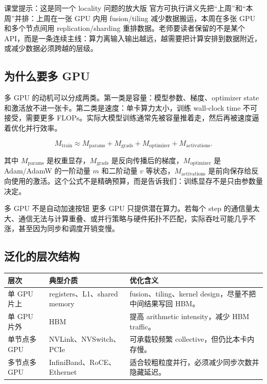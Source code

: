 \documentclass[a4paper]{article}
\begin{document}
\begin{knowledgebox}{课堂提示：这是同一个 locality 问题的放大版}
官方可执行讲义先把“上周”和“本周”并排：上周在一张 GPU 内用 fusion/tiling 减少数据搬运，本周在多张 GPU 和多个节点间用 replication/sharding 重排数据。老师要读者保留的不是某个 API，而是一条连续主线：算力离输入输出越远，越需要把计算安排到数据附近，或减少数据必须跨越的层级。
\end{knowledgebox}

\subsection{为什么要多 GPU}

多 GPU 的动机可以分成两类。第一类是容量：模型参数、梯度、optimizer state 和激活放不进一张卡。第二类是速度：单卡算力太小，训练 wall-clock time 不可接受，需要更多 FLOPs。实际大模型训练通常先被容量推着走，然后再被速度逼着优化并行效率。

\[
M_{\text{train}}
    \approx M_{\text{params}}
    + M_{\text{grads}}
    + M_{\text{optimizer}}
    + M_{\text{activations}} .
\]

其中 \(M_{\text{params}}\) 是权重显存，\(M_{\text{grads}}\) 是反向传播后的梯度，\(M_{\text{optimizer}}\) 是 Adam/AdamW 的一阶动量 \(m\) 和二阶动量 \(v\) 等状态，\(M_{\text{activations}}\) 是前向保存给反向使用的激活。这个公式不是精确预算，而是告诉我们：训练显存不是只由参数量决定。

\begin{warningbox}{多 GPU 不是自动加速按钮}
更多 GPU 只提供潜在算力。若每个 step 的通信量太大、通信无法与计算重叠、或并行策略与硬件拓扑不匹配，实际吞吐可能几乎不涨，甚至因为同步和调度开销变慢。
\end{warningbox}

\subsection{泛化的层次结构}

\begin{center}
\begin{tabular}{L{0.25\textwidth}L{0.3\textwidth}L{0.35\textwidth}}
\toprule
层次 & 典型介质 & 优化含义 \\
\midrule
单 GPU 片上 & registers、L1、shared memory & fusion、tiling、kernel design，尽量不把中间结果写回 HBM。 \\
单 GPU 片外 & HBM & 提高 arithmetic intensity，减少 HBM traffic。 \\
单节点多 GPU & NVLink、NVSwitch、PCIe & 可承载较频繁 collective，但仍比本卡内存慢。 \\
多节点多 GPU & InfiniBand、RoCE、Ethernet & 适合较粗粒度并行，必须减少同步次数并隐藏延迟。 \\
\bottomrule
\end{tabular}
\end{center}
\end{document}

